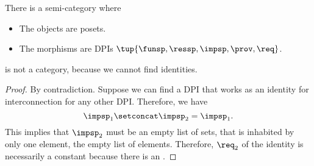 \begin{definition}
  \label{def:DPIcat}
  There is a semi-category \DPI where 
  \begin{itemize}
    \item The objects are posets.
    \item The morphisms are DPIs $\tup{\funsp,\ressp,\impsp,\prov,\req}$.
  \end{itemize}
\end{definition}

\begin{lemma}
\DPI is not a category, because we cannot find identities. 
\end{lemma}
\begin{proof}
By contradiction. Suppose we can find a DPI that works as an identity for interconnection for any other DPI.
Therefore, we have 
\begin{equation}
  \impsp_{1} \setconcat \impsp_{2} = \impsp_{1}.
\end{equation}
This implies that $\impsp_{2}$ must be an empty list of sets,  that is inhabited by only one element, the empty list of elements. Therefore, $\req_2$ of the identity is necessarily a constant because there is an . 
\end{proof}




